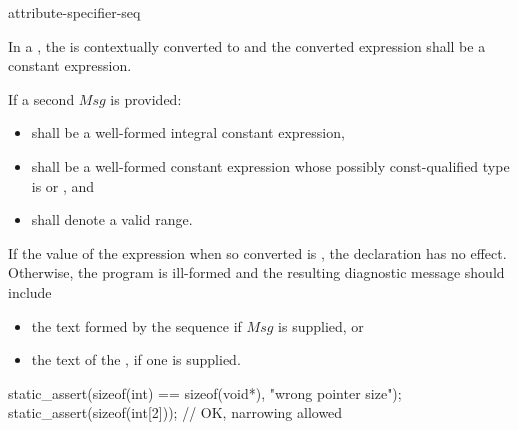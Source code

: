 \documentclass{wg21}
\begin{document}
\begin{bnf}
    \br
    \terminal{;}
\end{bnf}

\begin{bnf}
    \br
    attribute-specifier-seq \terminal{;}
\end{bnf}



\pnum
{}%

In a ,
the   
is contextually converted to  and
the converted expression shall be a constant expression.

\begin{addedblock}
If a second  $Msg$ is provided:
\begin{itemize}
    \item {} shall be a well-formed integral constant expression,
    \item {} shall be a well-formed constant expression whose possibly const-qualified type is  or , and
    \item \tcode{[$Msg$.data(), $Msg$.data() + $Msg$.size())} shall denote a valid range.
\end{itemize}
\end{addedblock}


If the value of the expression  when
so converted is , the declaration has no
effect.
Otherwise, the program is ill-formed and the resulting
diagnostic message should include 

\begin{addedblock}
\begin{itemize}
\item the text formed by the sequence \tcode{[$Msg$.data(), $Msg$.data() + $Msg$.size())} if $Msg$ is supplied, or
\item the text of the , if one is supplied.
\end{itemize}
\end{addedblock}


\begin{example}
\begin{codeblock}
    static_assert(sizeof(int) == sizeof(void*), "wrong pointer size");
    static_assert(sizeof(int[2]));          // OK, narrowing allowed
\end{codeblock}
\end{example}
\end{document}
